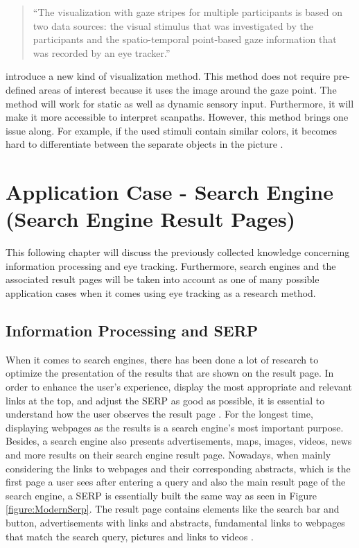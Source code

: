 \begin{quote}
``The visualization with gaze stripes for multiple participants is based on two data sources: the visual stimulus that was investigated by the participants and the spatio-temporal point-based gaze information that was recorded by an eye tracker.''
\autocite[3]{kurzhals2016gaze}
\end{quote}

\textcite[]{kurzhals2016gaze} introduce a new kind of visualization method. This method does not require pre-defined areas of interest because it uses the image around the gaze point. The method will work for static as well as dynamic sensory input. Furthermore, it will make it more accessible to interpret scanpaths. 
However, this method brings one issue along. For example, if the used stimuli contain similar colors, it becomes hard to differentiate between the separate objects in the picture \autocite[]{kurzhals2016gaze}.

\section{Application Case - Search Engine (Search Engine Result Pages)}
\label{section:SearchEngine}
This following chapter will discuss the previously collected knowledge concerning information processing and eye tracking. Furthermore, search engines and the associated result pages will be taken into account as one of many possible application cases when it comes using eye tracking as a research method.
\subsection{Information Processing and SERP}
\label{subsection:ReadingSERP}
When it comes to search engines, there has been done a lot of research to optimize the presentation of the results that are shown on the result page.  In order to enhance the user's experience, display the most appropriate and relevant links at the top, and adjust the SERP as good as possible, it is essential to understand how the user observes the result page \autocite{buscher2010good, liu2015influence}.
For the longest time, displaying webpages as the results is a search engine's most important purpose. Besides, a search engine also presents advertisements, maps, images, videos, news and more results on their search engine result page. Nowadays, when mainly considering the links to webpages and their corresponding abstracts, which is the first page a user sees after entering a query and also the main result page of the search engine, a SERP is essentially built the same way as seen in Figure \ref{figure:ModernSerp}.
The result page contains elements like the search bar and button, advertisements with links and abstracts, fundamental links to webpages that match the search query, pictures and links to videos \autocite{wang2016beyond}.

